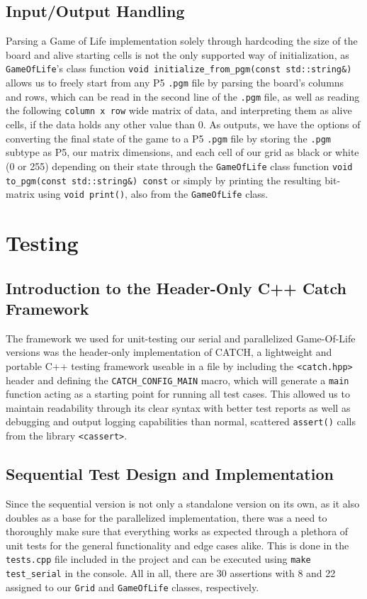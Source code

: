 \documentclass[11pt]{article}
\begin{document}
\subsection{Input/Output Handling}
Parsing a Game of Life implementation solely through hardcoding the size of the board and alive starting cells is not the only supported way of initialization, as \texttt{GameOfLife}'s class function \texttt{void initialize\_from\_pgm(const std::string\&)} allows us to freely start from any P5 \texttt{.pgm} file by parsing the board's columns and rows, which can be read in the second line of the \texttt{.pgm} file, as well as reading the following \texttt{column x row} wide matrix of data, and interpreting them as alive cells, if the data holds any other value than 0.
As outputs, we have the options of converting the final state of the game to a P5 \texttt{.pgm} file by storing the \texttt{.pgm} subtype as P5, our matrix dimensions, and each cell of our grid as black or white (0 or 255) depending on their state through the \texttt{GameOfLife} class function \texttt{void to\_pgm(const std::string\&) const} or simply by printing the resulting bit-matrix using \texttt{void print()}, also from the \texttt{GameOfLife} class.

\section{Testing}

\subsection{Introduction to the Header-Only C++ Catch Framework}
The framework we used for unit-testing our serial and parallelized Game-Of-Life versions was the header-only implementation of CATCH, a lightweight and portable C++ testing framework useable in a file by including the \texttt{<catch.hpp>} header and defining the \texttt{CATCH\_CONFIG\_MAIN} macro, which will generate a \texttt{main} function acting as a starting point for running all test cases. This allowed us to maintain readability through its clear syntax with better test reports as well as debugging and output logging capabilities than normal, scattered \texttt{assert()} calls from the library \texttt{<cassert>}.

\subsection{Sequential Test Design and Implementation}
Since the sequential version is not only a standalone version on its own, as it also doubles as a base for the parallelized implementation, there was a need to thoroughly make sure that everything works as expected through a plethora of unit tests for the general functionality and edge cases alike. This is done in the \texttt{tests.cpp} file included in the project and can be executed using \texttt{make test\_serial} in the console. All in all, there are 30 assertions with 8 and 22 assigned to our \texttt{Grid} and \texttt{GameOfLife} classes, respectively.
\end{document}
